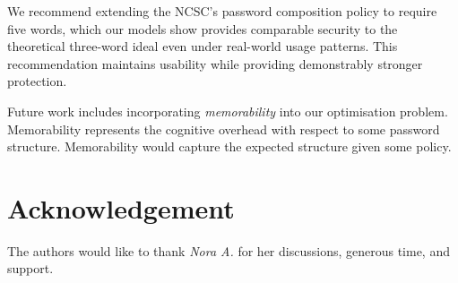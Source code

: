 We recommend extending the NCSC's password composition policy to require five words, which our models show provides comparable security to the theoretical three-word ideal even under real-world usage patterns. This recommendation maintains usability while providing demonstrably stronger protection. 

Future work includes incorporating \textit{memorability} into our optimisation problem. Memorability represents the cognitive overhead with respect to some password structure. Memorability would capture the expected structure given some policy.

\section*{Acknowledgement}
The authors would like to thank \textit{Nora A.} for her discussions, generous time, and support.


